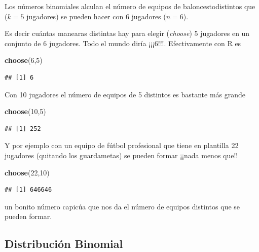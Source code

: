 \documentclass[]{book}
\newenvironment{Shaded}{\begin{snugshade}}{\end{snugshade}}
\newcommand{\DecValTok}[1]{\textcolor[rgb]{0.00,0.00,0.81}{#1}}
\newcommand{\KeywordTok}[1]{\textcolor[rgb]{0.13,0.29,0.53}{\textbf{#1}}}
\newcommand{\NormalTok}[1]{#1}
\begin{document}
Los números binomiales alculan el número de equipos de baloncestodistintos que (\(k=5\) jugadores) se pueden hacer con 6 jugadores (\(n=6\)).

Es decir cuántas manearas distintas hay para elegir (\emph{choose}) 5 jugadores en un conjunto de 6 jugadores. Todo el mundo diría
¡¡¡6!!!. Efectivamente con R es

\begin{Shaded}
\begin{Highlighting}[]
\KeywordTok{choose}\NormalTok{(}\DecValTok{6}\NormalTok{,}\DecValTok{5}\NormalTok{)}
\end{Highlighting}
\end{Shaded}

\begin{verbatim}
## [1] 6
\end{verbatim}

Con 10 jugadores el número de equipos de 5 distintos es bastante más grande

\begin{Shaded}
\begin{Highlighting}[]
\KeywordTok{choose}\NormalTok{(}\DecValTok{10}\NormalTok{,}\DecValTok{5}\NormalTok{)}
\end{Highlighting}
\end{Shaded}

\begin{verbatim}
## [1] 252
\end{verbatim}

Y por ejemplo con un equipo de fútbol profesional que tiene en plantilla 22 jugadores (quitando los guardametas) se pueden formar ¡¡nada menos que!!

\begin{Shaded}
\begin{Highlighting}[]
\KeywordTok{choose}\NormalTok{(}\DecValTok{22}\NormalTok{,}\DecValTok{10}\NormalTok{)}
\end{Highlighting}
\end{Shaded}

\begin{verbatim}
## [1] 646646
\end{verbatim}

un bonito número capicúa que nos da el número de equipos distintos que se pueden formar.

\hypertarget{distribuciuxf3n-binomial-1}{%
\subsection{Distribución Binomial}\label{distribuciuxf3n-binomial-1}}
\end{document}
